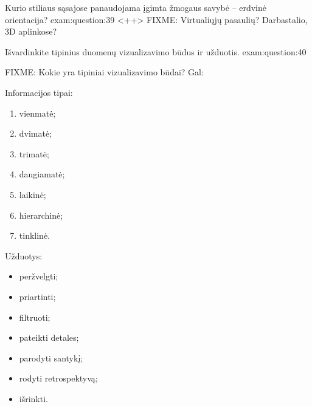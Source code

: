 \begin{question}{%
  Kurio stiliaus sąsajose panaudojama įgimta žmogaus savybė – erdvinė
  orientacija?
  }{exam:question:39}
  <++>
  FIXME: Virtualiųjų pasaulių? Darbastalio\cite[38]{skaidres-15}, 3D
  aplinkose?
\end{question}

\begin{question}{%
  Išvardinkite tipinius duomenų vizualizavimo būdus ir užduotis.
  }{exam:question:40}

  FIXME: Kokie yra tipiniai vizualizavimo būdai?
  Gal: \cite[50--64]{skaidres-15}

  Informacijos tipai\cite[49]{skaidres-15}:
  \begin{enumerate}
    \item vienmatė;
    \item dvimatė;
    \item trimatė;
    \item daugiamatė;
    \item laikinė;
    \item hierarchinė;
    \item tinklinė.
  \end{enumerate}

  Užduotys\cite[49]{skaidres-15}:
  \begin{itemize}
    \item peržvelgti;
    \item priartinti;
    \item filtruoti;
    \item pateikti detales;
    \item parodyti santykį;
    \item rodyti retrospektyvą;
    \item išrinkti.
  \end{itemize}

\end{question}
